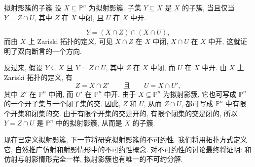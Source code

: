 \begin{Proposition}{拟射影簇的子簇}\leavevmode\label{prop:subvariety-is-intersection-of-relatively-closed-and-open}
设 $X\subseteq\mathbb{P}^{n}$ 为拟射影簇. 子集 $Y\subseteq X$ 是 $X$ 的子簇, 当且仅当 $Y=Z\cap U$, 其中 $Z$ 在 $X$ 中闭, 且 $U$ 在 $X$ 中开.
\end{Proposition}
\begin{Proof}
\[
  Y=(X\cap Z)\cap(X\cap U),
\]
而由 $X$ 上 Zariski 拓扑的定义, 可见 $X\cap Z$ 在 $X$ 中闭, $X\cap U$ 在 $X$ 中开, 这就证明了双向断言的一个方向.

反过来, 假设 $Y\subseteq X$ 且 $Y=Z\cap U$, 其中 $Z$ 在 $X$ 中闭, 而 $U$ 在 $X$ 中开. 由 $X$ 上 Zariski 拓扑的定义, 有
\[
  Z=X\cap Z'\qquad\text{且}\qquad U=X\cap U',
\]
其中 $Z'$ 在 $\mathbb{P}^{n}$ 中闭, 而 $U'$ 在 $\mathbb{P}^{n}$ 中开. 由于 $X\subseteq\mathbb{P}^{n}$ 为拟射影簇, 它也可写成 $\mathbb{P}^{n}$ 的一个开子集与一个闭子集的交. 因此, $Z$ 和 $U$, 从而 $Z\cap U$, 都可写成 $\mathbb{P}^{n}$ 中有限个开集和闭集的交. 由于有限个开集的交是开的, 有限个闭集的交是闭的, 所以 $Y=Z\cap U$ 是 $\mathbb{P}^{n}$ 中的拟射影簇, 从而是 $X$ 的子簇.
\end{Proof}

现在已定义拟射影簇, 下一节将研究拟射影簇的不可约性. 我们将用拓扑方式定义它, 自然推广仿射和射影情形中的不可约性概念. 对不可约性的讨论最终将证明: 和仿射与射影情形完全一样, 拟射影簇也有唯一的不可约分解.

